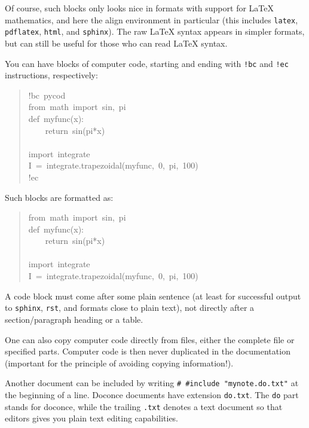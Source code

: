 \documentclass[a4paper]{article}
\begin{document}
Of course, such blocks only looks nice in formats with support
for LaTeX mathematics, and here the align environment in particular
(this includes \texttt{latex}, \texttt{pdflatex}, \texttt{html}, and \texttt{sphinx}). The raw
LaTeX syntax appears in simpler formats, but can still be useful
for those who can read LaTeX syntax.

You can have blocks of computer code, starting and ending with
\texttt{!bc} and \texttt{!ec} instructions, respectively:
%
\begin{quote}{\ttfamily \raggedright \noindent
!bc~pycod\\
from~math~import~sin,~pi\\
def~myfunc(x):\\
~~~~return~sin(pi*x)\\
~\\
import~integrate\\
I~=~integrate.trapezoidal(myfunc,~0,~pi,~100)\\
!ec
}
\end{quote}

Such blocks are formatted as:
%
\begin{quote}{\ttfamily \raggedright \noindent
from~math~import~sin,~pi\\
def~myfunc(x):\\
~~~~return~sin(pi*x)\\
~\\
import~integrate\\
I~=~integrate.trapezoidal(myfunc,~0,~pi,~100)
}
\end{quote}

A code block must come after some plain sentence (at least for successful
output to \texttt{sphinx}, \texttt{rst}, and formats close to plain text),
not directly after a section/paragraph heading or a table.

One can also copy computer code directly from files, either the
complete file or specified parts.  Computer code is then never
duplicated in the documentation (important for the principle of
avoiding copying information!).

Another document can be included by writing \texttt{\# \#include "mynote.do.txt"}
at the beginning of a line.  Doconce documents have
extension \texttt{do.txt}. The \texttt{do} part stands for doconce, while the
trailing \texttt{.txt} denotes a text document so that editors gives you
plain text editing capabilities.


\end{document}
